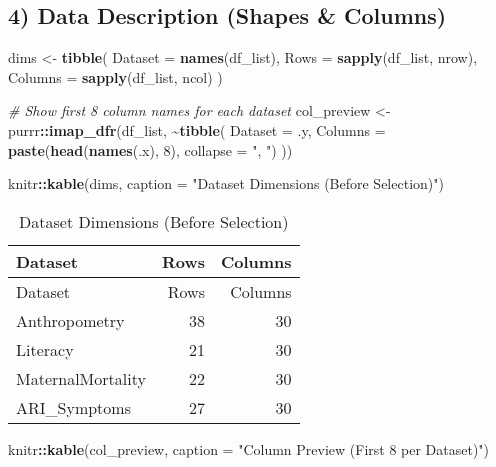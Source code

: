 \documentclass[
]{article}
\newenvironment{Shaded}{\begin{snugshade}}{\end{snugshade}}
\newcommand{\AttributeTok}[1]{\textcolor[rgb]{0.13,0.29,0.53}{#1}}
\newcommand{\CommentTok}[1]{\textcolor[rgb]{0.56,0.35,0.01}{\textit{#1}}}
\newcommand{\DecValTok}[1]{\textcolor[rgb]{0.00,0.00,0.81}{#1}}
\newcommand{\FunctionTok}[1]{\textcolor[rgb]{0.13,0.29,0.53}{\textbf{#1}}}
\newcommand{\NormalTok}[1]{#1}
\newcommand{\OtherTok}[1]{\textcolor[rgb]{0.56,0.35,0.01}{#1}}
\newcommand{\SpecialCharTok}[1]{\textcolor[rgb]{0.81,0.36,0.00}{\textbf{#1}}}
\newcommand{\StringTok}[1]{\textcolor[rgb]{0.31,0.60,0.02}{#1}}
\begin{document}
\subsection{4) Data Description (Shapes \&
Columns)}\label{data-description-shapes-columns}

\begin{Shaded}
\begin{Highlighting}[]
\NormalTok{dims }\OtherTok{\textless{}{-}} \FunctionTok{tibble}\NormalTok{(}
  \AttributeTok{Dataset =} \FunctionTok{names}\NormalTok{(df\_list),}
  \AttributeTok{Rows    =} \FunctionTok{sapply}\NormalTok{(df\_list, nrow),}
  \AttributeTok{Columns =} \FunctionTok{sapply}\NormalTok{(df\_list, ncol)}
\NormalTok{)}

\CommentTok{\# Show first 8 column names for each dataset}
\NormalTok{col\_preview }\OtherTok{\textless{}{-}}\NormalTok{ purrr}\SpecialCharTok{::}\FunctionTok{imap\_dfr}\NormalTok{(df\_list, }\SpecialCharTok{\textasciitilde{}}\FunctionTok{tibble}\NormalTok{(}
  \AttributeTok{Dataset =}\NormalTok{ .y,}
  \AttributeTok{Columns =} \FunctionTok{paste}\NormalTok{(}\FunctionTok{head}\NormalTok{(}\FunctionTok{names}\NormalTok{(.x), }\DecValTok{8}\NormalTok{), }\AttributeTok{collapse =} \StringTok{", "}\NormalTok{)}
\NormalTok{))}

\NormalTok{knitr}\SpecialCharTok{::}\FunctionTok{kable}\NormalTok{(dims, }\AttributeTok{caption =} \StringTok{"Dataset Dimensions (Before Selection)"}\NormalTok{)}
\end{Highlighting}
\end{Shaded}

\begin{longtable}[]{@{}lrr@{}}
\caption{Dataset Dimensions (Before Selection)}\tabularnewline
\toprule\noalign{}
Dataset & Rows & Columns \\
\midrule\noalign{}
\endfirsthead
\toprule\noalign{}
Dataset & Rows & Columns \\
\midrule\noalign{}
\endhead
\bottomrule\noalign{}
\endlastfoot
Anthropometry & 38 & 30 \\
Literacy & 21 & 30 \\
MaternalMortality & 22 & 30 \\
ARI\_Symptoms & 27 & 30 \\
\end{longtable}

\begin{Shaded}
\begin{Highlighting}[]
\NormalTok{knitr}\SpecialCharTok{::}\FunctionTok{kable}\NormalTok{(col\_preview, }\AttributeTok{caption =} \StringTok{"Column Preview (First 8 per Dataset)"}\NormalTok{)}
\end{Highlighting}
\end{Shaded}
\end{document}
